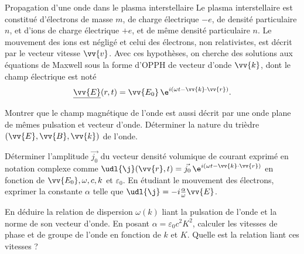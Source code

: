 \begin{exo}[PC][2][TD]{Propagation d'une onde dans le plasma interstellaire}
Le plasma interstellaire est constitué d'électrons de masse $m$, de charge électrique $-e$, de densité particulaire $n$, et d'ions de charge électrique $+e$, et de même densité particulaire $n$. %
Le mouvement des ions est négligé et celui des électrons, non relativistes, est décrit par le vecteur vitesse $\vv{v}$. Avec ces hypothèses, on cherche des solutions aux équations de Maxwell  sous la forme d'OPPH de vecteur d'onde $\vv{k}$, dont le champ électrique est noté
\begin{equation}
 \underline{\vv{E}}(r,t)=\vv{E_0}\,\e^{i(\omega t-\vv{k}\cdot\vv{r})}.
 \end{equation}
\begin{quest}
\item Montrer que le champ magnétique de l'onde est aussi décrit par une onde plane de mêmes pulsation et vecteur d'onde. Déterminer la nature du trièdre $(\vv{E},\vv{B},\vv{k})$ de l'onde.
\item Déterminer l'amplitude $\Vec{j_0}$ du vecteur densité volumique de courant exprimé en notation complexe comme $\udl{\j}(\vv{r},t)=\Vec{j_0}\,\e^{i(\omega t-\vv{k}\cdot\vv{r})}$ en fonction de $\vv{E_0},\omega,c,k$ et $\varepsilon_0$. En étudiant le mouvement des électrons, exprimer la constante $\alpha$ telle que $\udl{\j}=-i\frac{\alpha}{\omega}\vv{E}$.
\item En déduire la relation de dispersion $\omega(k)$ liant la pulsation de l'onde et la norme de son vecteur d'onde. En posant $\alpha=\varepsilon_0 c^2 K^2$, calculer les vitesses de phase et de groupe de l'onde en fonction de $k$ et $K$. Quelle est la relation liant ces vitesses ?
\end{quest}
\end{exo}
